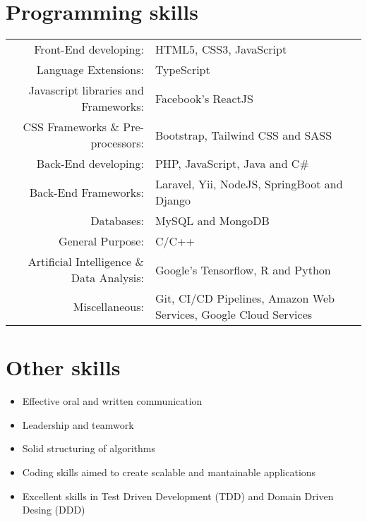 \documentclass[a4paper,10.9pt]{article}
\begin{document}
\section{Programming skills}
\begin{tabular}{rl}
 Front-End developing:& HTML5, CSS3, JavaScript\\
 Language Extensions:& TypeScript\\
 Javascript libraries and Frameworks:& Facebook's ReactJS\\
 CSS Frameworks \& Pre-processors:& Bootstrap, Tailwind CSS and SASS\\
 Back-End developing:& PHP, JavaScript, Java and C\#\\
 Back-End Frameworks:& Laravel, Yii, NodeJS, SpringBoot and Django\\
 Databases:& MySQL and MongoDB\\
 General Purpose:& C/C++\\
 Artificial Intelligence \& Data Analysis:& Google's Tensorflow, R and Python\\
Miscellaneous:& Git, CI/CD Pipelines, Amazon Web Services, Google Cloud Services
\end{tabular}

\section{Other skills}

\begin{itemize}
	\item Effective oral and written communication
\item Leadership and teamwork
\item Solid structuring of algorithms
\item Coding skills aimed to create scalable and mantainable applications
\item Excellent skills in Test Driven Development (TDD) and Domain Driven Desing (DDD) 
\end{itemize}
\end{document}
